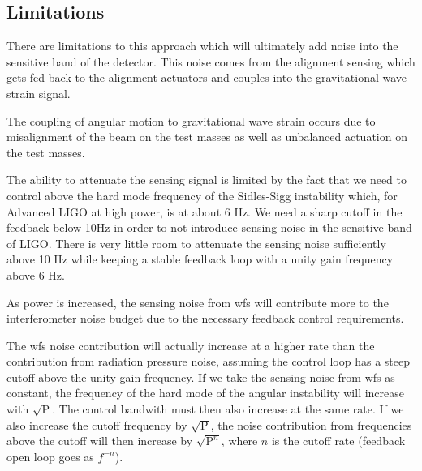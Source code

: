 \subsection{Limitations}


%
There are limitations to this approach which will ultimately add
noise into the sensitive band of the detector.
This noise comes from the alignment sensing which gets fed back to the
alignment actuators and couples into the gravitational wave strain signal.

The coupling of angular motion to gravitational wave strain occurs due to
misalignment of the beam on the test masses as well as unbalanced actuation
on the test masses.


The ability to attenuate the sensing signal is limited by the fact that
we need to control above the hard mode frequency of the Sidles-Sigg instability
\cite{2006PhLA..354..167S}
which,
for Advanced LIGO at high power, is at about 6 Hz.
We need a sharp cutoff in the feedback below 10Hz in order to not introduce
sensing noise in the sensitive band of LIGO.
There is very little room to attenuate the sensing noise sufficiently above 10
Hz while keeping a stable feedback loop with a unity gain frequency above 6 Hz.


As power is increased, the sensing noise from \ac{wfs} will contribute more
to the interferometer noise budget due to the necessary feedback control
requirements.

The \ac{wfs} noise contribution will actually increase at a higher rate
than the contribution
from radiation pressure noise, assuming the control loop has a steep cutoff
above the unity gain frequency.
If we take the sensing noise from \ac{wfs} as constant, the frequency of the
hard mode of the angular instability will increase with $\sqrt{\mathrm{P}}$.
The control bandwith must then also increase at the same rate.
If we also increase the cutoff frequency by $\sqrt{\mathrm{P}}$, the noise
contribution from frequencies above the cutoff will then increase by
$\sqrt{\mathrm{P}^{n}}$, where $n$ is the cutoff rate (feedback open loop goes as
$f^{-n}$).

